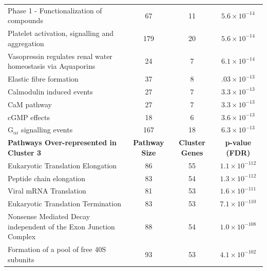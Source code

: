 \begin{table}[!hp]
{\begin{threeparttable}
\begin{tabular}{lccc}
  \rowcolor{Cluster_Green!20} 
  Phase 1 - Functionalization of compounds &  67 &  11 & $5.6 \times 10^{-14}$ \\ 
  \rowcolor{Cluster_Green!15} 
  Platelet activation, signalling and aggregation & 179 &  20 & $5.6 \times 10^{-14}$ \\ 
  \rowcolor{Cluster_Green!20} 
  Vasopressin regulates renal water homeostasis via Aquaporins &  24 &   7 & $6.1 \times 10^{-14}$ \\ 
  \rowcolor{Cluster_Green!15} 
  Elastic fibre formation &  37 &   8 & $.03 \times 10^{-13}$ \\ 
  \rowcolor{Cluster_Green!20} 
  Calmodulin induced events &  27 &   7 & $3.3 \times 10^{-13}$ \\ 
  \rowcolor{Cluster_Green!15} 
  CaM pathway &  27 &   7 & $3.3 \times 10^{-13}$ \\ 
  \rowcolor{Cluster_Green!20} 
  cGMP effects &  18 &   6 & $3.6 \times 10^{-13}$ \\ 
  \rowcolor{Cluster_Green!15} 
  G$_{\alpha i}$ signalling events & 167 &  18 & $6.3 \times 10^{-13}$ \\ 
  \hline
  \cellcolor{white} \large{\textbf{Pathways Over-represented in Cluster 3}} & \large{\textbf{Pathway Size}} & \large{\textbf{Cluster Genes}} & \large{\textbf{p-value (\gls{FDR})}} \\ %
  \hline
  \rowcolor{Cluster_Orange!30}
  Eukaryotic Translation Elongation &  86 &  55 & $1.1 \times 10^{-112}$ \\ 
  \rowcolor{Cluster_Orange!20} 
  Peptide chain elongation &  83 &  54 & $1.3 \times 10^{-112}$ \\ 
  \rowcolor{Cluster_Orange!30} 
  Viral \acrshort{mRNA} Translation &  81 &  53 & $1.6 \times 10^{-111}$ \\ 
  \rowcolor{Cluster_Orange!20} 
  Eukaryotic Translation Termination &  83 &  53 & $7.1 \times 10^{-110}$ \\ 
  \rowcolor{Cluster_Orange!30} 
  Nonsense Mediated Decay independent of the Exon Junction Complex &  88 &  54 & $1.0 \times 10^{-108}$ \\ 
  \rowcolor{Cluster_Orange!20} 
  Formation of a pool of free 40S subunits &  93 &  53 & $4.1 \times 10^{-102}$ \\ 

\end{tabular}
\end{threeparttable}}
\end{table}
